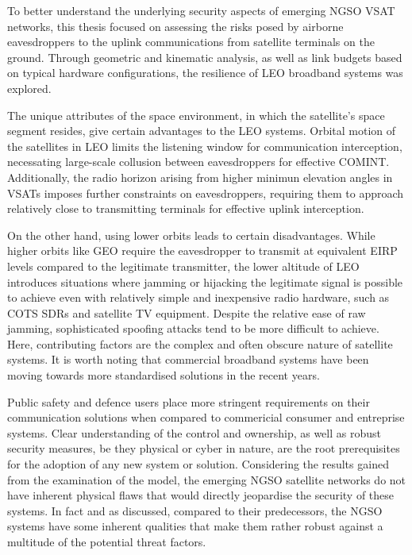 \documentclass[english, 12pt, a4paper, elec, utf8, a-1b, online]{aaltothesis}
\begin{document}
To better understand the underlying security aspects of emerging NGSO VSAT networks, this thesis focused on assessing the risks posed by airborne eavesdroppers to the uplink communications from satellite terminals on the ground. Through geometric and kinematic analysis, as well as link budgets based on typical hardware configurations, the resilience of LEO broadband systems was explored.

The unique attributes of the space environment, in which the satellite's space segment resides, give certain advantages to the LEO systems. Orbital motion of the satellites in LEO limits the listening window for communication interception, necessating large-scale collusion between eavesdroppers for effective COMINT. Additionally, the radio horizon  arising from higher minimun elevation angles in VSATs imposes further constraints on eavesdroppers, requiring them to approach relatively close to transmitting terminals for effective uplink interception.

On the other hand, using lower orbits leads to certain disadvantages. While higher orbits like GEO require the eavesdropper to transmit at equivalent EIRP levels compared to the legitimate transmitter, the lower altitude of LEO introduces situations where jamming or hijacking the legitimate signal is possible to achieve even with relatively simple and inexpensive radio hardware, such as COTS SDRs and satellite TV equipment. Despite the relative ease of raw jamming, sophisticated spoofing attacks tend to be more difficult to achieve. Here, contributing factors are the complex and often obscure nature of satellite systems. It is worth noting that commercial broadband systems have been moving towards more standardised solutions in the recent years. 

Public safety and defence users place more stringent requirements on their communication solutions when compared to commericial consumer and entreprise systems. Clear understanding of the control and ownership, as well as robust security measures, be they physical or cyber in nature, are the root prerequisites for the adoption of any new system or solution. Considering the results gained from the examination of the model, the emerging NGSO satellite networks do not have inherent physical flaws that would directly jeopardise the security of these systems. In fact and as discussed, compared to their predecessors, the NGSO systems have some inherent qualities that make them rather robust against a multitude of the potential threat factors.
\end{document}
